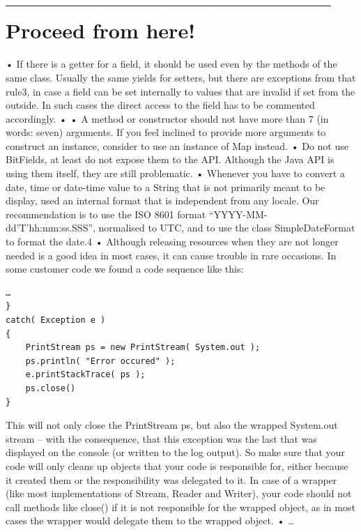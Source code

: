 \documentclass[11pt,a4paper, titlepage, parskip=half, headsepline, footsepline, cleardoublepage=current, headheight=1cm]{scrbook}
\begin{document}
\begin{lstlisting}
\end{lstlisting}

\begin{lstlisting}
\end{lstlisting}

\section{-------------------------------------------- Proceed from here!}
    • If there is a getter for a field, it should be used even by the methods of the same class. Usually the same yields for setters, but there are exceptions from that rule3, in case a field can be set internally to values that are invalid if set from the outside. In such cases the direct access to the field has to be commented accordingly.
    • 
    • A method or constructor should not have more than 7 (in words: seven) arguments. If you feel inclined to provide more arguments to construct an instance, consider to use an instance of Map instead.
    • Do not use BitFields, at least do not expose them to the API. Although the Java API is using them itself, they are still problematic.
    • Whenever you have to convert a date, time or date-time value to a String that is not primarily meant to be display, used an internal format that is independent from any locale. Our recommendation is to use the ISO 8601 format “YYYY-MM-dd'T'hh:mm:ss.SSS”, normalised to UTC, and to use the class SimpleDateFormat to format the date.4
    • Although releasing resources when they are not longer needed is a good idea in most cases, it can cause trouble in rare occasions.
In some customer code we found a code sequence like this:
\begin{lstlisting}
…
}
catch( Exception e )
{
    PrintStream ps = new PrintStream( System.out );
    ps.println( "Error occured" );
    e.printStackTrace( ps );
    ps.close()
}
\end{lstlisting}
This will not only close the PrintStream ps, but also the wrapped System.out stream – with the consequence, that this exception was the last that was displayed on the console (or written to the log output).
So make sure that your code will only cleans up objects that your code is responsible for, either because it created them or the responsibility was delegated to it. In case of a wrapper (like most implementations of Stream, Reader and Writer), your code should not call methods like close() if it is not responsible for the wrapped object, as in most cases the wrapper would delegate them to the wrapped object.
    • …
\end{document}
